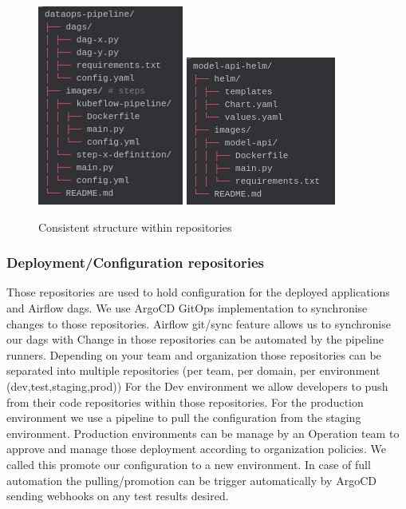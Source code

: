 \begin{figure}[h!]
    \centering
    \includegraphics[scale=0.35]{images/project/git-repo-dataops}
    \includegraphics[scale=0.35]{images/project/git-repo-helm}
    \caption{Consistent structure within repositories}
    \label{fig:sidebyside}
\end{figure}


\subsubsection{Deployment/Configuration repositories}
Those repositories are used to hold configuration for the deployed applications and Airflow dags.
We use ArgoCD GitOps implementation to synchronise changes to those repositories.
Airflow git/sync feature allows us to synchronise our dags with
Change in those repositories can be automated by the pipeline runners.
Depending on your team and organization those repositories can be separated into multiple repositories (per team, per domain, per environment (dev,test,staging,prod))
For the Dev environment we allow developers to push from their code repositories within those repositories.
For the production environment we use a pipeline to pull the configuration from the staging environment.
Production environments can be manage by an Operation team to approve and manage those deployment
according to organization policies.
We called this promote our configuration to a new environment.
In case of full automation the pulling/promotion can be trigger automatically by ArgoCD sending webhooks on any test results desired.

